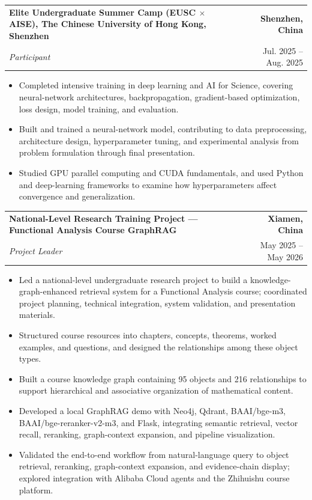 \documentclass[letterpaper,10pt]{article}
\makeatletter
\newcommand{\resumeProject}[4]{
    \vspace{2pt}
    \noindent
    \begin{tabularx}{\textwidth}{@{}X@{\hspace{1em}}r@{}}
        \textbf{#1} & \textbf{#2} \\
        \textit{\textcolor{textgray}{#3}} & \textcolor{textgray}{#4} \\
    \end{tabularx}
    \vspace{-4pt}
}
\makeatother
\begin{document}
\resumeProject
{Elite Undergraduate Summer Camp (EUSC $\times$ AISE), The Chinese University of Hong Kong, Shenzhen}
{Shenzhen, China}
{Participant}
{Jul. 2025 -- Aug. 2025}
\begin{itemize}
  \item Completed intensive training in deep learning and AI for Science, covering neural-network architectures, backpropagation, gradient-based optimization, loss design, model training, and evaluation.
  \item Built and trained a neural-network model, contributing to data preprocessing, architecture design, hyperparameter tuning, and experimental analysis from problem formulation through final presentation.
  \item Studied GPU parallel computing and CUDA fundamentals, and used Python and deep-learning frameworks to examine how hyperparameters affect convergence and generalization.
\end{itemize}

\resumeProject
{National-Level Research Training Project --- Functional Analysis Course GraphRAG}
{Xiamen, China}
{Project Leader}
{May 2025 -- May 2026}
\begin{itemize}
  \item Led a national-level undergraduate research project to build a knowledge-graph-enhanced retrieval system for a Functional Analysis course; coordinated project planning, technical integration, system validation, and presentation materials.
  \item Structured course resources into chapters, concepts, theorems, worked examples, and questions, and designed the relationships among these object types.
  \item Built a course knowledge graph containing 95 objects and 216 relationships to support hierarchical and associative organization of mathematical content.
  \item Developed a local GraphRAG demo with Neo4j, Qdrant, BAAI/bge-m3, BAAI/bge-reranker-v2-m3, and Flask, integrating semantic retrieval, vector recall, reranking, graph-context expansion, and pipeline visualization.
  \item Validated the end-to-end workflow from natural-language query to object retrieval, reranking, graph-context expansion, and evidence-chain display; explored integration with Alibaba Cloud agents and the Zhihuishu course platform.
\end{itemize}
\end{document}
